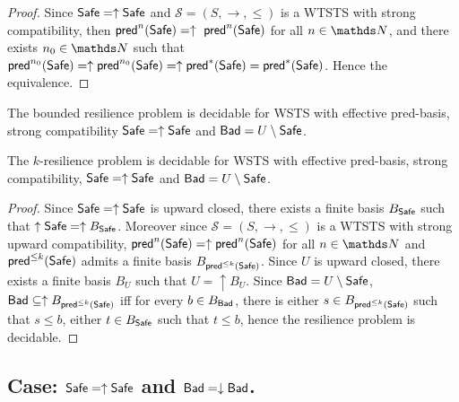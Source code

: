 \begin{proof}
Since $\textsf{Safe}=\uparrow \textsf{Safe}$ and
$\mathscr{S}=(S,\rightarrow,\leq)$ is a WTSTS with strong %
compatibility, then $\textsf{pred}^n(\textsf{Safe})= \uparrow~\textsf{pred}^n(\textsf{Safe})$ for all $n \in \N$,
and there exists $n_0 \in \N$ such that 
$\textsf{pred}^{n_0}(\textsf{Safe}) = \uparrow \textsf{pred}^{n_0}(\textsf{Safe}) = \uparrow \textsf{pred}^*(\textsf{Safe}) = \textsf{pred}^*(\textsf{Safe})$.
Hence the equivalence.
\end{proof}

\begin{corollary}\label{B-up-up}
The bounded resilience problem is decidable for WSTS with effective pred-basis,
strong compatibility
 $\textsf{Safe}=\uparrow \textsf{Safe}$
and $\textsf{Bad}=U \setminus \textsf{Safe}$.
\end{corollary}


\begin{theorem}\label{k-up-up}
The %
$k$-resilience problem is decidable for WSTS with effective pred-basis, strong %
compatibility, $\textsf{Safe}=\uparrow \textsf{Safe}$
and $\textsf{Bad}=U \setminus \textsf{Safe}$.
\end{theorem}

\begin{proof}
Since $\textsf{Safe}=\uparrow \textsf{Safe}$ is upward closed, there exists a finite basis $B_{ \textsf{Safe}}$ such that $\uparrow \textsf{Safe} = \uparrow B_{\textsf{Safe}}$. 
Moreover since $\mathscr{S}=(S,\rightarrow,\leq)$ is a WTSTS with strong upward compatibility,  $\textsf{pred}^n(\textsf{Safe})=\uparrow \textsf{pred}^n(\textsf{Safe})$ for all $n\in \N$ and $\textsf{pred}^{\leq k}(\textsf{Safe})$ admits a finite basis $B_{\textsf{pred}^{\leq k}(\textsf{Safe})}$. %
Since $U$  is upward closed, there exists a finite basis $B_{U}$ such that $U = \uparrow B_{U}$. %
Since $\textsf{Bad} = U \setminus \textsf{Safe}$, $\textsf{Bad} \subseteq \uparrow B_{\textsf{pred}^{\leq k}(\textsf{Safe})}$ iff for every $b \in B_{\textsf{Bad}}$, there is either $s \in B_{\textsf{pred}^{\leq k}(\textsf{Safe})}$ such that $s \leq b$, either $t \in B_{\textsf{Safe}}$ such that $t\leq b$,
hence the resilience problem is decidable.
\end{proof}




\subsection{Case: $\textsf{Safe}=\uparrow \textsf{Safe}$ and $\textsf{Bad}=\downarrow \textsf{Bad}$.}

